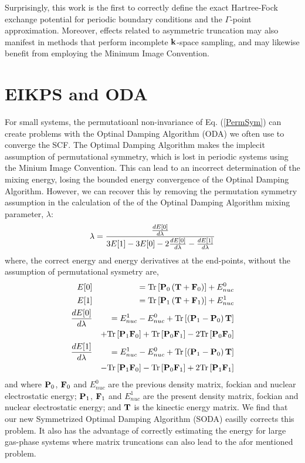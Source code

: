 \documentclass[prb,aps,nobibnotes,twocolumn,doublespace,twocolumngrid,superbib]{revtex4}
\begin{document}
Surprisingly, this work is the first to correctly define the exact Hartree-Fock 
exchange potential for periodic boundary conditions and the $\Gamma$-point approximation.  Moreover,
effects related to asymmetric truncation may also manifest in methods that perform incomplete 
${\bf k}$-space sampling, and may likewise benefit from employing the Minimum Image Convention. 

\section{EIKPS and ODA}

For small systems, the permutatioanl non-invariance of Eq. (\ref{PermSym}) can create problems 
with the Optinal Damping Algorithm (ODA) \cite{ECances00} we often use to converge the SCF. The Optimal Damping
Algorithm makes the implecit assumption of permutational symmetry, which is lost in periodic systems 
using the Minium Image Convention. This can lead to an incorrect determination of the mixing energy, losing
the bounded energy convergence of the Optinal Damping Algorithm.  
However, we can recover this by removing the permutation symmetry assumption in the calculation of the of 
the Optinal Damping Algorithm mixing parameter, $\lambda$: 
%
\begin{eqnarray}
\lambda = {{\frac{d E[0]}{d \lambda}} \over {3E[1]-3E[0]-2{\frac{d E[0]}{d \lambda}}-{\frac{d E[1]}{d \lambda}}}}
\end{eqnarray}
%
where, the correct energy and energy derivatives at the end-points, without the assumption of
permutational sysmetry are,
\begin{eqnarray}
E[0] &&= {\rm Tr}\left[{\bf P}_0 \left({\bf T} + {\bf F}_0 \right)\right]+E^{0}_{nuc} \nonumber\\
E[1] &&= {\rm Tr}\left[{\bf P}_1 \left({\bf T} + {\bf F}_1 \right)\right]+E^{1}_{nuc} \nonumber\\
\frac{d E[0]}{d \lambda} &&=  E^{1}_{nuc}-E^{0}_{nuc}  
+{\rm Tr}\left[\left( {\bf P}_1 - {\bf P}_0 \right) {\bf T}  \right]\nonumber\\
&& +{\rm Tr}\left[ {\bf P}_1 {\bf F}_0 \right] 
   +{\rm Tr}\left[ {\bf P}_0 {\bf F}_1 \right] 
   -2 {\rm Tr}\left[ {\bf P}_0 {\bf F}_0 \right] \nonumber\\
\frac{d E[1]}{d \lambda} &&=  E^{1}_{nuc}-E^{0}_{nuc}  
+{\rm Tr}\left[\left( {\bf P}_1 - {\bf P}_0 \right) {\bf T}  \right]\nonumber\\
&& -{\rm Tr}\left[ {\bf P}_1 {\bf F}_0 \right] 
   -{\rm Tr}\left[ {\bf P}_0 {\bf F}_1 \right] 
   +2 {\rm Tr}\left[ {\bf P}_1 {\bf F}_1 \right] \nonumber\\
\end{eqnarray}
and where  ${\bf P}_0$, ${\bf F}_0$ and $E^{0}_{nuc}$ are the previous density matrix, fockian and nuclear 
electrostatic energy; ${\bf P}_1$, ${\bf F}_1$ and $E^{1}_{nuc}$ are the present density matrix, fockian 
and nuclear electrostatic energy; and  ${\bf T}$ is the kinectic energy matrix. We find that our new Symmetrized 
Optimal Damping Algorithm (SODA) easilly corrects this problem. It also has the advantage of correctly estimating
the energy for large gas-phase systems where matrix truncations can also lead to the afor mentioned problem. 
\end{document}
